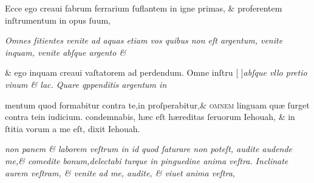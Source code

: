 \documentclass{article}
\begin{document}
\vspace{-3\baselineskip}
\begin{multicols}{2}
	\fontsize{6.25}{7}\selectfont
	\justifying
	\noindent \quad Ecce ego creaui fabrum ferrarium ſuflantem in igne primas, \& proferentem inſtrumentum in opus ſuum,\linebreak

	\columnbreak
	\justifying
	\noindent
	\textit{Omnes ſitientes venite ad aquas etiam vos quibus non eſt argentum, venite inquam, venite abſque argento \&\linebreak}
\end{multicols}
\fontsize{6.25}{7}\selectfont
\vspace{-2.7\baselineskip}
\noindent \& ego inquam creaui vaſtatorem ad perdendum. Omne inſtru \hfill[\hfill %
	{\grecs {}\selectfont{}}\hfill]\hfill \textit{abſque vllo pretio vinum \& lac. Quare qppenditis argentum in}
\vspace{-1.6\baselineskip}
\begin{multicols}{2}
	\fontsize{6.25}{7}\selectfont
	\justifying
	\noindent mentum quod formabitur contra te,in proſperabitur,\& \textsc{ omnem} linguam qu\ae{} ſurget contra tein iudicium.\linebreak
	condemnabis, h\ae{}c eſt h\ae{}reditas ſeruorum Iehouah, \& in ſtitia vorum a me eſt, dixit Iehouah.

	\columnbreak
	\justifying
	\noindent
	\textit{non panem \& laborem veſtrum in id quod ſaturare non poteſt, audite audende me,\& comedite bonum,delectabi\linebreak
		turque in pinguedine anima veſtra. Inclinate aurem veſtram, \& venite ad me, audite, \& viuet anima veſtra,\linebreak
	}
\end{multicols}
\end{document}
